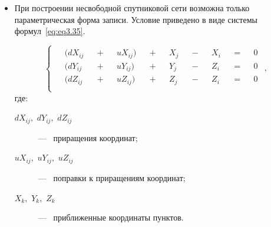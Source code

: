 \begin{enumerate}
\begin{itemize}
				
			\paragraph*{Условный способ.}
			
			Для построения свободной спутниковой сети необходимы независимые измерения, т.е. измерения на пунктах сети выполняются в несколько сеансов.
			
			Условие описывается системой~\cref{eq:eq3.8}.
			
			Более подробно способ описан в разделе~\cref{Условие_Фигур}.
			
			\paragraph*{Параметрический способ.}
			
			Условия приведены в системе~\cref{eq:eq3.10}.
			
			Более подробно способ описан в разделе~\cref{Условие_Координат}.
			


		\item При построении несвободной спутниковой сети возможна только параметрическая форма записи. Условие приведено в виде системы формул~\cref{eq:eq3.35}.

	

			\begin{equation}\label{eq:eq3.35}
				\!
				\begin{cases}
					\begin{aligned}
						&(dX_{ij} &&+ &&uX_{ij}) &&+ &&X_{j} &&- &&X_{i} &&= &&0 \\
						&(dY_{ij} &&+ &&uY_{ij}) &&+ &&Y_{j} &&- &&Z_{i} &&= &&0 \\
						&(dZ_{ij} &&+ &&uZ_{ij}) &&+ &&Z_{j} &&- &&Z_{i} &&= &&0 \\
					\end{aligned}
				\end{cases},
			\end{equation}
			где: 
			\begin{description}
				\item[$dX_{ij},$ $dY_{ij},$ $dZ_{ij}$] ---~ приращения координат; 
				\item[$uX_{ij},$ $uY_{ij},$ $uZ_{ij}$] ---~ поправки к приращениям координат;
				\item[$X_{k},$ $Y_{k},$ $Z_{k}$] ---~ приближенные координаты пунктов.
			\end{description}


\end{itemize}
\end{enumerate}

